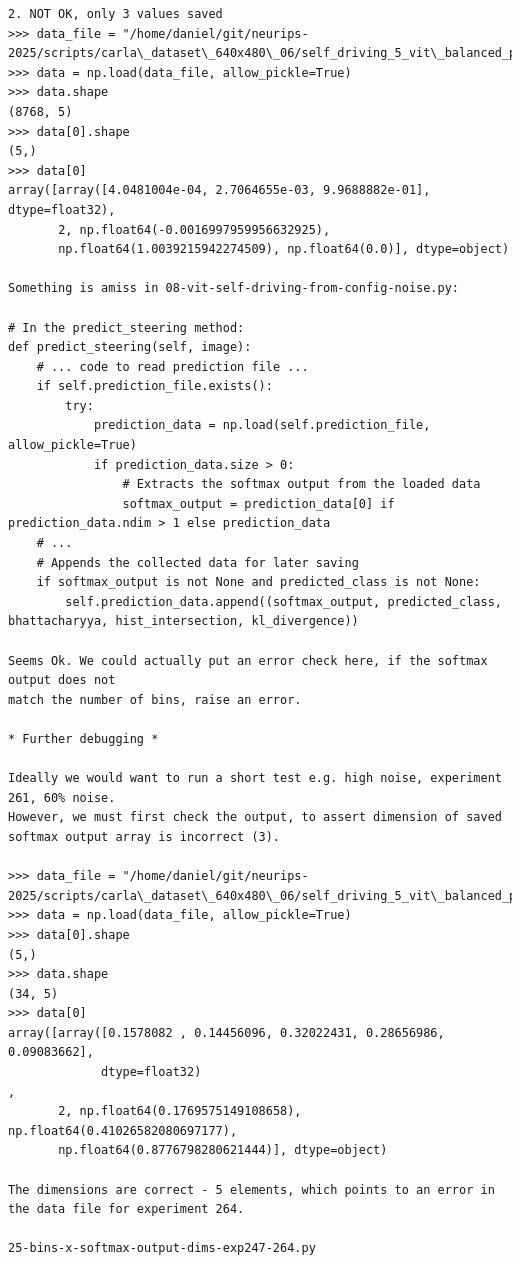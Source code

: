 \begin{verbatim}
2. NOT OK, only 3 values saved
>>> data_file = "/home/daniel/git/neurips-2025/scripts/carla\_dataset\_640x480\_06/self_driving_5_vit\_balanced_pep_0\_250611_2117.npy"
>>> data = np.load(data_file, allow_pickle=True)
>>> data.shape
(8768, 5)
>>> data[0].shape
(5,)
>>> data[0]
array([array([4.0481004e-04, 2.7064655e-03, 9.9688882e-01], dtype=float32),
       2, np.float64(-0.0016997959956632925),
       np.float64(1.0039215942274509), np.float64(0.0)], dtype=object)

Something is amiss in 08-vit-self-driving-from-config-noise.py:

# In the predict_steering method:
def predict_steering(self, image):
    # ... code to read prediction file ...
    if self.prediction_file.exists():
        try:
            prediction_data = np.load(self.prediction_file, allow_pickle=True)
            if prediction_data.size > 0:
                # Extracts the softmax output from the loaded data
                softmax_output = prediction_data[0] if prediction_data.ndim > 1 else prediction_data
    # ...
    # Appends the collected data for later saving
    if softmax_output is not None and predicted_class is not None:
        self.prediction_data.append((softmax_output, predicted_class, bhattacharyya, hist_intersection, kl_divergence))

Seems Ok. We could actually put an error check here, if the softmax output does not
match the number of bins, raise an error.

* Further debugging *

Ideally we would want to run a short test e.g. high noise, experiment 261, 60% noise.
However, we must first check the output, to assert dimension of saved softmax output array is incorrect (3).

>>> data_file = "/home/daniel/git/neurips-2025/scripts/carla\_dataset\_640x480\_06/self_driving_5_vit\_balanced_pep_60\_250610_1607.npy"
>>> data = np.load(data_file, allow_pickle=True)
>>> data[0].shape
(5,)
>>> data.shape
(34, 5)
>>> data[0]
array([array([0.1578082 , 0.14456096, 0.32022431, 0.28656986, 0.09083662],
             dtype=float32)                                               ,
       2, np.float64(0.1769575149108658), np.float64(0.41026582080697177),
       np.float64(0.8776798280621444)], dtype=object)

The dimensions are correct - 5 elements, which points to an error in the data file for experiment 264.

25-bins-x-softmax-output-dims-exp247-264.py


\end{verbatim}
